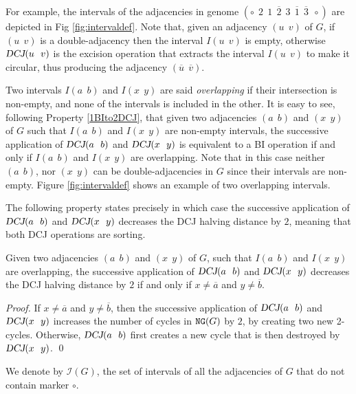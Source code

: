\documentclass{llncs}
\newcommand{\fst}[1]{ \ensuremath{#1} }
\newcommand{\snd}[1]{ \ensuremath{\overline{#1}} }
\newcommand\aff[2]{\ensuremath{(\fst{#1}~~\fst{#2})}}
\renewcommand{\NG}{\ensuremath{\mbox{\texttt{NG}}}}
\def\DCJ{\ensuremath{\mbox{\sl DCJ}}}
\begin{document}
For example, the intervals of the adjacencies in genome $(\circ~~\fst{2}~~\fst{1}~~\snd{2}~~\fst{3}~~\snd{1}~~\snd{3}~~\circ )$ are depicted in Fig \ref{fig:intervaldef}.
Note that, given an adjacency  $(\fst{u}~~\fst{v})$ of $G$,  if  $(\fst{u}~~\fst{v})$ is a double-adjacency then the interval $I(\fst{u}~~\fst{v})$ is empty, otherwise  $\DCJ(\fst{u}~~\fst{v})$ is the excision operation that extracts the interval $I(\fst{u}~~\fst{v})$ to make it circular, thus producing the adjacency $(\snd{u}~~\snd{v})$.



Two intervals  $I\aff{a}{b}$ and $I\aff{x}{y}$ are said \emph{overlapping} if
their intersection is non-empty, and none of the intervals is included in the 
other.
It is easy to see, following Property \ref{1BIto2DCJ}, that given two
adjacencies $\aff{a}{b}$ and $\aff{x}{y}$ of $G$ such that
$I\aff{a}{b}$ and $I\aff{x}{y}$ are non-empty intervals, the
successive application of $\DCJ\aff{a}{b}$ and $\DCJ\aff{x}{y}$ is
equivalent  to a BI operation if and only if $I\aff{a}{b}$ and
$I\aff{x}{y}$ are overlapping. Note that in this case neither
$\aff{a}{b}$, nor  $\aff{x}{y}$ can be double-adjacencies in $G$ since
their  intervals are non-empty. Figure \ref{fig:intervaldef} shows an
example of two overlapping intervals. 


The following property states precisely in which case the successive application of $\DCJ\aff{a}{b}$ and $\DCJ\aff{x}{y}$ decreases the DCJ halving distance by $2$, meaning that both DCJ operations are sorting.

\begin{property}
Given two adjacencies $\aff{a}{b}$ and $\aff{x}{y}$ of $G$, such that 
$I\aff{a}{b}$ and $I\aff{x}{y}$ are overlapping, the successive application of $\DCJ\aff{a}{b}$ and $\DCJ\aff{x}{y}$ decreases the DCJ halving distance by $2$ if and only if  $x \neq \snd{a}$ and $y \neq \snd{b}$.
\end{property}
\begin{proof}
If $x \neq \snd{a}$ and $y \neq \snd{b}$, then the successive application of $\DCJ\aff{a}{b}$ and $\DCJ\aff{x}{y}$ increases the number of cycles in $\NG(G)$ by $2$, by creating two new 2-cycles. Otherwise, $\DCJ\aff{a}{b}$ first creates a new cycle that is then destroyed by  $\DCJ\aff{x}{y}$.
\qed
\end{proof}

We denote by $\mathcal{I}(G)$, the set of intervals of all the adjacencies of $G$ that do not contain marker $\circ$.
\end{document}
